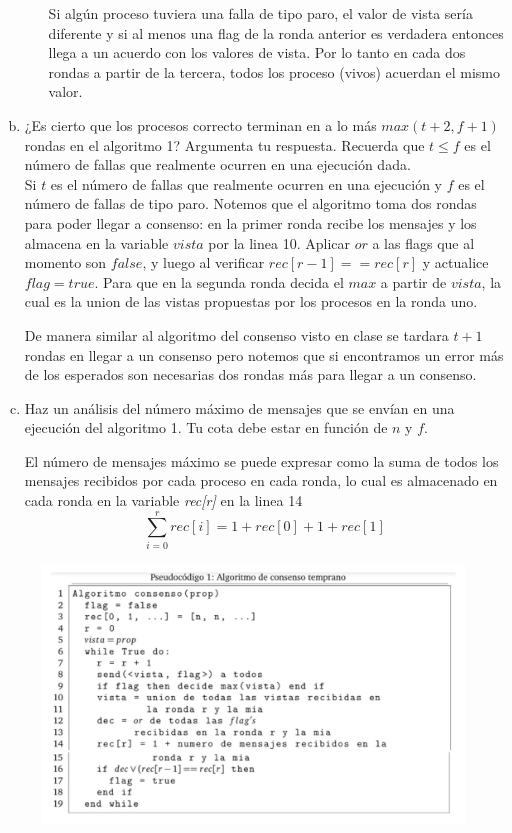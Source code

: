 \begin{enumerate}[a)]
\begin{itemize}
        Si algún proceso tuviera una falla de tipo paro, el valor de vista sería
        diferente y si al menos una flag de la ronda anterior es verdadera entonces
        llega a un acuerdo con los valores de vista. Por lo tanto en cada dos
        rondas a partir de la tercera, todos los proceso (vivos) acuerdan el mismo valor.
    \end{itemize}


    \item ¿Es cierto que los procesos correcto terminan en a lo más
    $max(t +2, f +1)$ rondas en el algoritmo 1? Argumenta tu respuesta.
    Recuerda que $t \leq f$ es el número de fallas que realmente ocurren en una
    ejecución dada.\\
    Si $t$ es el número de fallas que realmente ocurren en una ejecución y $f$ es el número de fallas de tipo paro.
    Notemos que el algoritmo toma dos rondas para poder llegar a consenso: en la primer ronda recibe los mensajes y los almacena en la variable $vista$ por la linea 10. Aplicar $or$ a las flags que al momento son $false$, y luego al verificar $rec[r-1]==rec[r]$ y actualice $flag=true$. Para que en la segunda ronda decida el $max$ a partir de $vista$, la cual es la union de las vistas propuestas por los procesos en la ronda uno.

    De manera similar al algoritmo del consenso visto en clase se tardara $t+1$ rondas en llegar a un consenso pero notemos que si encontramos un error más de los esperados son necesarias dos rondas más para llegar a un consenso.

    \item Haz un análisis del número máximo de mensajes que se envían en una
    ejecución del algoritmo 1. Tu cota debe estar en función de $n$ y $f$.

    El número de mensajes máximo se puede expresar como la suma de todos los mensajes recibidos por cada proceso en cada ronda, lo cual es almacenado en cada ronda en la variable \textit{rec[r]} en la linea 14
    \[\sum_{i=0}^r rec[i] = 1+rec[0]+1+rec[1]\]
\end{enumerate}

\newpage
\begin{figure}
    \includegraphics[width=\textwidth]{consensoTemprano.png}
\end{figure}
